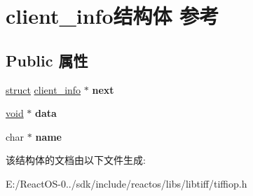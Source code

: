 \hypertarget{structclient__info}{}\section{client\+\_\+info结构体 参考}
\label{structclient__info}
\subsection*{Public 属性}
\begin{DoxyCompactItemize}
\item 
\mbox{\label{structclient__info_a47bc04379705b3297a7e32281a8c4a38}} 
\hyperlink{interfacestruct}{struct} \hyperlink{structclient__info}{client\+\_\+info} $\ast$ {\bfseries next}
\item 
\mbox{\label{structclient__info_a1144754ace59c03cdd47bbad9bb135a8}} 
\hyperlink{interfacevoid}{void} $\ast$ {\bfseries data}
\item 
\mbox{\label{structclient__info_ae85039424df6c0dbc0452113876b33c7}} 
char $\ast$ {\bfseries name}
\end{DoxyCompactItemize}


该结构体的文档由以下文件生成\+:\begin{DoxyCompactItemize}
\item 
E\+:/\+React\+O\+S-\/0../sdk/include/reactos/libs/libtiff/tiffiop.\+h\end{DoxyCompactItemize}
